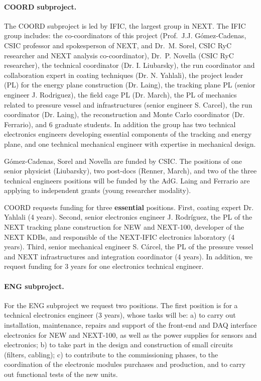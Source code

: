 \paragraph{COORD subproject.}

The COORD subproject is led by IFIC, the largest group in NEXT. The IFIC group includes: the co-coordinators of this project (Prof.~J.J. G\'omez-Cadenas, CSIC professor and spokesperson of NEXT, and Dr.~M. Sorel, CSIC RyC researcher and NEXT analysis co-coordinator), Dr.~P. Novella (CSIC RyC researcher), the technical coordinator (Dr. I. Liubarsky), the run coordinator and collaboration expert in coating techniques (Dr. N. Yahlali), the project leader (PL) for the energy plane construction (Dr. Laing), the tracking plane PL (senior engineer J. Rodriguez), the field cage PL (Dr. March), the PL of mechanics related to pressure vessel and infrastructures (senior engineer S. Carcel), the run coordinator (Dr. Laing), the reconstruction and Monte Carlo coordinator (Dr. Ferrario), and 6 graduate students. In addition the group has two technical electronics engineers developing essential components of the tracking and energy plane, and one technical mechanical engineer with expertise in mechanical design. 

G\'omez-Cadenas, Sorel and Novella are funded by CSIC. The positions of one senior physicist (Liubarsky), two post-docs (Renner, March), and two of the three technical engineers positions will be funded by the AdG. Laing and Ferrario are applying to independent grants (young researcher modality). 

COORD requests funding for three {\bf essential} positions. First, coating expert Dr. Yahlali (4 years). Second, senior electronics engineer J. Rodríguez, the PL of the NEXT tracking plane construction for NEW and NEXT-100, developer of the NEXT KDBs, and responsible of the NEXT-IFIC electronics laboratory (4 years). Third, senior mechanical engineer S. Cárcel, the PL of the pressure vessel and NEXT infrastructures and integration coordinator (4 years). In addition, we request funding for 3 years for one electronics technical engineer.  

\paragraph{ENG subproject.}

For the ENG subproject we request two positions. The first position is for a technical electronics engineer (3 years), whose tasks will be: a) to carry out installation, maintenance, repairs and support of the front-end and DAQ interface electronics for NEW and NEXT-100, as well as the power supplies for sensors and electronics; b) to take part in the design and construction of small circuits (filters, cabling); c) to contribute to the commissioning phases, to the coordination of the electronic modules purchases and production, and to carry out functional tests of the new units. 

